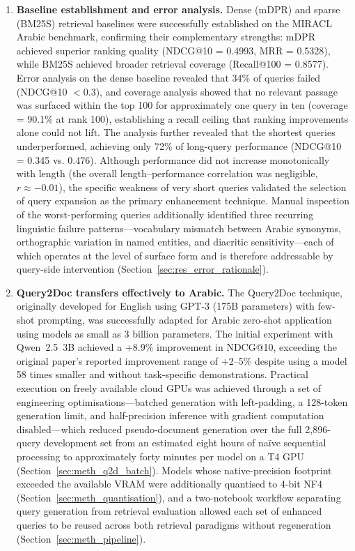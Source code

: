 \begin{enumerate}[label=\roman*.]
    \item \textbf{Baseline establishment and error analysis.} Dense (mDPR) and sparse (BM25S) retrieval baselines were successfully established on the MIRACL Arabic benchmark, confirming their complementary strengths: mDPR achieved superior ranking quality (NDCG@10 = 0.4993, MRR = 0.5328), while BM25S achieved broader retrieval coverage (Recall@100 = 0.8577). Error analysis on the dense baseline revealed that 34\% of queries failed (NDCG@10 $< 0.3$), and coverage analysis showed that no relevant passage was surfaced within the top 100 for approximately one query in ten (coverage = 90.1\% at rank 100), establishing a recall ceiling that ranking improvements alone could not lift. The analysis further revealed that the shortest queries underperformed, achieving only 72\% of long-query performance (NDCG@10 = 0.345 vs. 0.476). Although performance did not increase monotonically with length (the overall length--performance correlation was negligible, $r \approx -0.01$), the specific weakness of very short queries validated the selection of query expansion as the primary enhancement technique. Manual inspection of the worst-performing queries additionally identified three recurring linguistic failure patterns---vocabulary mismatch between Arabic synonyms, orthographic variation in named entities, and diacritic sensitivity---each of which operates at the level of surface form and is therefore addressable by query-side intervention (Section~\ref{sec:res_error_rationale}).
    \item \textbf{Query2Doc transfers effectively to Arabic.} The Query2Doc technique, originally developed for English using GPT-3 (175B parameters) with few-shot prompting, was successfully adapted for Arabic zero-shot application using models as small as 3 billion parameters. The initial experiment with Qwen~2.5~3B achieved a +8.9\% improvement in NDCG@10, exceeding the original paper's reported improvement range of +2--5\% despite using a model 58 times smaller and without task-specific demonstrations. Practical execution on freely available cloud GPUs was achieved through a set of engineering optimisations---batched generation with left-padding, a 128-token generation limit, and half-precision inference with gradient computation disabled---which reduced pseudo-document generation over the full 2,896-query development set from an estimated eight hours of naïve sequential processing to approximately forty minutes per model on a T4 GPU (Section~\ref{sec:meth_q2d_batch}). Models whose native-precision footprint exceeded the available VRAM were additionally quantised to 4-bit NF4 (Section~\ref{sec:meth_quantisation}), and a two-notebook workflow separating query generation from retrieval evaluation allowed each set of enhanced queries to be reused across both retrieval paradigms without regeneration (Section~\ref{sec:meth_pipeline}).

\end{enumerate}
